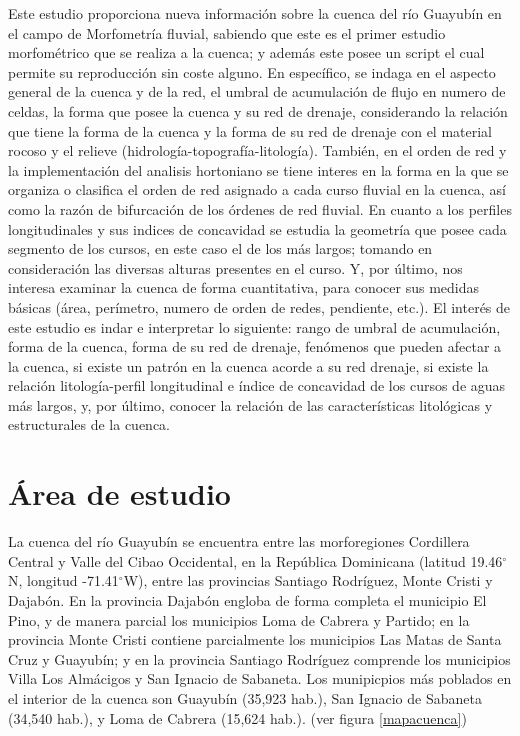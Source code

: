 \documentclass[11pt,]{article}
\begin{document}
Este estudio proporciona nueva información sobre la cuenca del río
Guayubín en el campo de Morfometría fluvial, sabiendo que este es el
primer estudio morfométrico que se realiza a la cuenca; y además este
posee un script el cual permite su reproducción sin coste alguno. En
específico, se indaga en el aspecto general de la cuenca y de la red, el
umbral de acumulación de flujo en numero de celdas, la forma que posee
la cuenca y su red de drenaje, considerando la relación que tiene la
forma de la cuenca y la forma de su red de drenaje con el material
rocoso y el relieve (hidrología-topografía-litología). También, en el
orden de red y la implementación del analisis hortoniano se tiene
interes en la forma en la que se organiza o clasifica el orden de red
asignado a cada curso fluvial en la cuenca, así como la razón de
bifurcación de los órdenes de red fluvial. En cuanto a los perfiles
longitudinales y sus indices de concavidad se estudia la geometría que
posee cada segmento de los cursos, en este caso el de los más largos;
tomando en consideración las diversas alturas presentes en el curso. Y,
por último, nos interesa examinar la cuenca de forma cuantitativa, para
conocer sus medidas básicas (área, perímetro, numero de orden de redes,
pendiente, etc.). El interés de este estudio es indar e interpretar lo
siguiente: rango de umbral de acumulación, forma de la cuenca, forma de
su red de drenaje, fenómenos que pueden afectar a la cuenca, si existe
un patrón en la cuenca acorde a su red drenaje, si existe la relación
litología-perfil longitudinal e índice de concavidad de los cursos de
aguas más largos, y, por último, conocer la relación de las
características litológicas y estructurales de la cuenca.

\section{Área de estudio}\label{uxe1rea-de-estudio}

La cuenca del río Guayubín se encuentra entre las morforegiones
Cordillera Central y Valle del Cibao Occidental, en la República
Dominicana (latitud 19.46\(^\circ\)N, longitud -71.41\(^\circ\)W), entre
las provincias Santiago Rodríguez, Monte Cristi y Dajabón. En la
provincia Dajabón engloba de forma completa el municipio El Pino, y de
manera parcial los municipios Loma de Cabrera y Partido; en la provincia
Monte Cristi contiene parcialmente los municipios Las Matas de Santa
Cruz y Guayubín; y en la provincia Santiago Rodríguez comprende los
municipios Villa Los Almácigos y San Ignacio de Sabaneta. Los
munipicpios más poblados en el interior de la cuenca son Guayubín
(35,923 hab.), San Ignacio de Sabaneta (34,540 hab.), y Loma de Cabrera
(15,624 hab.). (ver figura \ref {mapacuenca})
\end{document}
